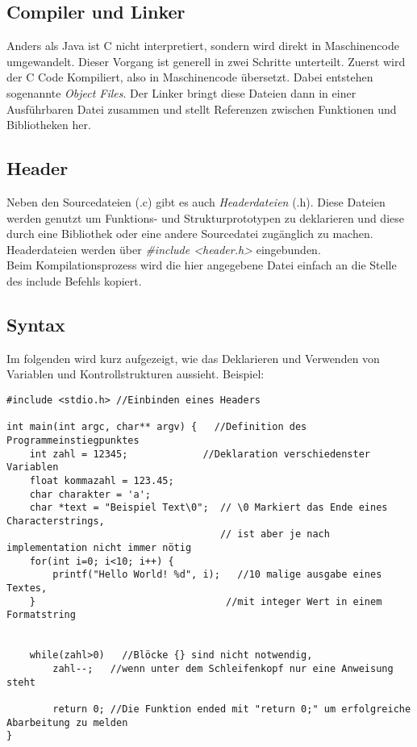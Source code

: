 \documentclass{article}
\begin{document}
\subsection{Compiler und Linker}
Anders als Java ist C nicht interpretiert, sondern wird direkt in Maschinencode umgewandelt. Dieser Vorgang ist generell in zwei Schritte unterteilt. Zuerst wird der C Code Kompiliert, also in Maschinencode übersetzt. Dabei entstehen sogenannte \textit{Object Files}. Der Linker bringt diese Dateien dann in
einer Ausführbaren Datei zusammen und stellt Referenzen zwischen Funktionen und Bibliotheken her.

\subsection{Header}
Neben den Sourcedateien (.c) gibt es auch \textit{Headerdateien} (.h). Diese Dateien werden genutzt um Funktions- und Strukturprototypen zu deklarieren und diese durch eine Bibliothek oder eine andere Sourcedatei zugänglich zu machen.
Headerdateien werden über \textit{\#include {\textless}header.h{\textgreater}} eingebunden. \\Beim Kompilationsprozess wird die hier angegebene Datei einfach an die Stelle des include Befehls kopiert.

\subsection{Syntax}
Im folgenden wird kurz aufgezeigt, wie das Deklarieren und Verwenden von Variablen und Kontrollstrukturen aussieht. Beispiel:
\newpage
\begin{verbatim}
#include <stdio.h> //Einbinden eines Headers

int main(int argc, char** argv) {	//Definition des Programmeinstiegpunktes
    int zahl = 12345;             //Deklaration verschiedenster Variablen
    float kommazahl = 123.45;      	
    char charakter = 'a';
    char *text = "Beispiel Text\0";  // \0 Markiert das Ende eines Characterstrings,
                                     // ist aber je nach implementation nicht immer nötig
    for(int i=0; i<10; i++) {
        printf("Hello World! %d", i);	//10 malige ausgabe eines Textes,
    }                                 //mit integer Wert in einem Formatstring
    
	
    while(zahl>0)	//Blöcke {} sind nicht notwendig,
        zahl--;   //wenn unter dem Schleifenkopf nur eine Anweisung steht
		
	    return 0; //Die Funktion ended mit "return 0;" um erfolgreiche Abarbeitung zu melden
}
\end{verbatim}
\end{document}
